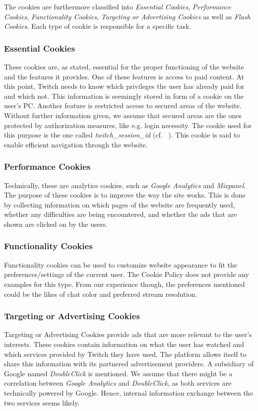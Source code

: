 The cookies are furthermore classified into \textit{Essential Cookies},\textit{ Performance Cookies}, \textit{Functionality Cookies}, \textit{Targeting or Advertising Cookies} as well as \textit{Flash Cookies}. Each type of cookie is responsible for a specific task. 

\subsubsection{Essential Cookies}\label{section:essential-cookies}
These cookies are, as stated, essential for the proper functioning of the website and the features it provides. One of these features is access to paid content. At this point, Twitch needs to know which privileges the user has already paid for and which not. This information is seemingly stored in form of a cookie on the user's PC. Another feature is restricted access to secured areas of the website. Without further information given, we assume that secured areas are the ones protected by authorization measures, like e.g. login necessity. The cookie used for this purpose is the one called \textit{twitch\_session\_id} (cf. ~). This cookie is said to enable efficient navigation through the website. 

\subsubsection{Performance Cookies}
Technically, these are analytics cookies, such as \textit{Google Analytics} and \textit{Mixpanel}. The purpose of these cookies is to improve the way the site works. This is done by collecting information on which pages of the website are frequently used, whether any difficulties are being encountered, and whether the ads that are shown are clicked on by the users. 

\subsubsection{Functionality Cookies}
Functionality cookies can be used to customize website appearance to fit the preferences/settings of the current user. The Cookie Policy does not provide any examples for this type. From our experience though, the preferences mentioned could be the likes of chat color and preferred stream resolution. %

\subsubsection{Targeting or Advertising Cookies}
Targeting or Advertising Cookies provide ads that are more relevant to the user's interests. These cookies contain information on what the user has watched and which services provided by Twitch they have used. The platform allows itself to share this information with its partnered advertisement providers. A subsidiary of Google named \textit{DoubleClick} is mentioned. We assume that there might be a correlation between\textit{ Google Analytics} and \textit{DoubleClick}, as both services are technically powered by Google. Hence, internal information exchange between the two services seems likely. 

